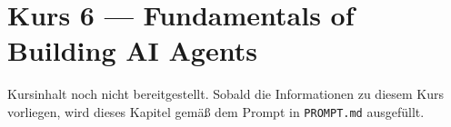 \chapter{Kurs 6 --- Fundamentals of Building AI Agents}

\begin{luecke}
Kursinhalt noch nicht bereitgestellt. Sobald die Informationen zu diesem Kurs vorliegen,
wird dieses Kapitel gem\"a\ss{} dem Prompt in \texttt{PROMPT.md} ausgef\"ullt.
\end{luecke}

